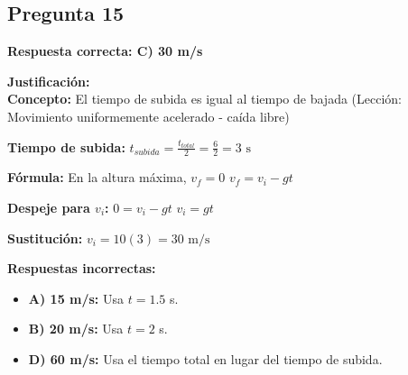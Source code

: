 \begin{respuestabox}
\subsection{Pregunta 15}
\textcolor{verdecorrecto}{\textbf{Respuesta correcta: C) 30 m/s}}

\textbf{Justificación:}\\
\textbf{Concepto:} El tiempo de subida es igual al tiempo de bajada (Lección: Movimiento uniformemente acelerado - caída libre)

\textbf{Tiempo de subida:}
$t_{subida} = \frac{t_{total}}{2} = \frac{6}{2} = 3 \text{ s}$

\textbf{Fórmula:} En la altura máxima, $v_f = 0$
$v_f = v_i - gt$

\textbf{Despeje para $v_i$:}
$0 = v_i - gt$
$v_i = gt$

\textbf{Sustitución:}
$v_i = 10(3) = 30 \text{ m/s}$

\textbf{Respuestas incorrectas:}
\begin{itemize}
    \item \textbf{A) 15 m/s:} Usa $t = 1.5$ s.
    \item \textbf{B) 20 m/s:} Usa $t = 2$ s.
    \item \textbf{D) 60 m/s:} Usa el tiempo total en lugar del tiempo de subida.
\end{itemize}
\end{respuestabox}
